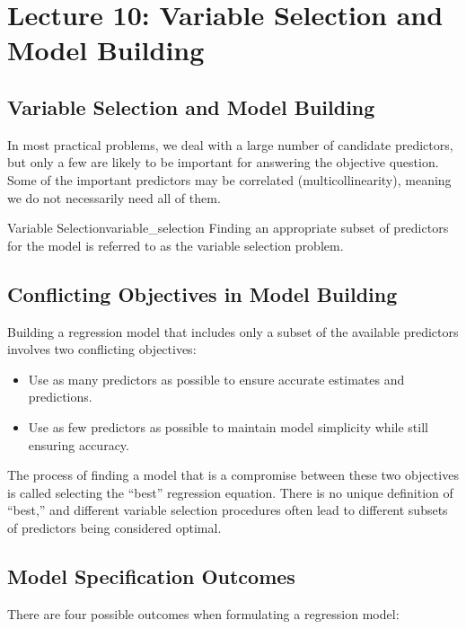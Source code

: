 \section{Lecture 10: Variable Selection and Model Building}

\subsection{Variable Selection and Model Building}

In most practical problems, we deal with a large number of candidate predictors, but only a few are likely to be important for answering the objective question. Some of the important predictors may be correlated (multicollinearity), meaning we do not necessarily need all of them.

\begin{defn}{Variable Selection}{variable_selection}
Finding an appropriate subset of predictors for the model is referred to as the variable selection problem.
\end{defn}

\subsection{Conflicting Objectives in Model Building}

Building a regression model that includes only a subset of the available predictors involves two conflicting objectives:

\begin{itemize}
\item Use as many predictors as possible to ensure accurate estimates and predictions.
\item Use as few predictors as possible to maintain model simplicity while still ensuring accuracy.
\end{itemize}

The process of finding a model that is a compromise between these two objectives is called selecting the ``best'' regression equation. There is no unique definition of ``best,'' and different variable selection procedures often lead to different subsets of predictors being considered optimal.

\subsection{Model Specification Outcomes}

There are four possible outcomes when formulating a regression model:

